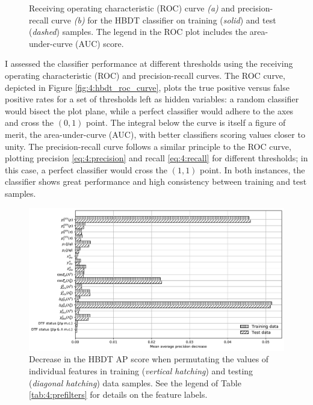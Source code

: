 \begin{figure}
\begin{subfigure}{.45\textwidth}
		\caption{}
		\label{fig:4:hbdt_precall_curve}
	\end{subfigure}
	\caption{Receiving operating characteristic (ROC) curve \textit{(a)} and precision-recall curve \textit{(b)} for the HBDT classifier on training (\textit{solid}) and test (\textit{dashed}) samples. The legend in the ROC plot includes the area-under-curve (AUC) score.}
	\label{fig:4:hbdt_performance_curves}
\end{figure}

I assessed the classifier performance at different thresholds using the receiving operating characteristic (ROC) and precision-recall curves.
The ROC curve, depicted in Figure \ref{fig:4:hbdt_roc_curve}, plots the true positive versus false positive rates for a set of thresholds left as hidden variables:
a random classifier would bisect the plot plane, while a perfect classifier would adhere to the axes and cross the $(0,1)$ point.
The integral below the curve is itself a figure of merit, the area-under-curve (AUC), with better classifiers scoring values closer to unity.
The precision-recall curve follows a similar principle to the ROC curve, plotting precision \eqref{eq:4:precision} and recall \eqref{eq:4:recall} for different thresholds;
in this case, a perfect classifier would cross the $(1,1)$ point.
In both instances, the classifier shows great performance and high consistency between training and test samples.

\begin{figure}
	\centering
	\includegraphics[width=\textwidth]{graphics/04-event_selection/importances.pdf}
	\caption{Decrease in the HBDT AP score when permutating the values of individual features in training (\textit{vertical hatching}) and testing (\textit{diagonal hatching}) data samples. See the legend of Table \ref{tab:4:prefilters} for details on the feature labels.}
	\label{fig:4:hbdt_importances}
\end{figure}

